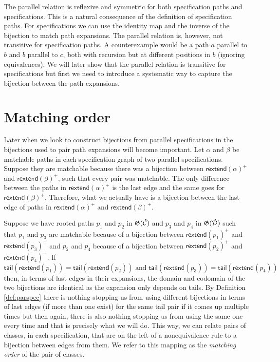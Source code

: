 The parallel relation is reflexive and symmetric for both specification paths and specifications. This is a natural consequence of the definition of specification paths. For specifications we can use the identity map and the inverse of the bijection to match path expansions. The parallel relation is, however, not transitive for specification paths. A counterexample would be a path $a$ parallel to $b$ and $b$ parallel to $c$, both with recursion but at different positions in $b$ (ignoring equivalences). We will later show that the parallel relation is transitive for specifications but first we need to introduce a systematic way to capture the bijection between the path expansions.

\section{Matching order}
Later when we look to construct bijections from parallel specifications in  the bijections used to pair path expansions will become important. Let $\alpha$ and $\beta$ be matchable paths in each specification graph of two parallel specifications. Suppose they are matchable because there was a bijection between $\textsf{rextend}(\alpha)^+$ and $\textsf{rextend}(\beta)^+$, such that every pair was matchable. The only difference between the paths in $\textsf{rextend}(\alpha)^+$ is the last edge and the same goes for $\textsf{rextend}(\beta)^+$. Therefore, what we actually have is a bijection between the last edge of paths in $\textsf{rextend}(\alpha)^+$ and $\textsf{rextend}(\beta)^+$. 

Suppose we have rooted paths $p_1$ and $p_2$ in $\mathfrak{G}(\check{\mathcal{C}})$ and $p_3$ and $p_4$ in $\mathfrak{G}(\check{\mathcal{D}})$ such that $p_1$ and $p_3$ are matchable because of a bijection between $\textsf{rextend}(p_1)^+$ and $\textsf{rextend}(p_3)^+$ and $p_2$ and $p_4$ because of a bijection between $\textsf{rextend}(p_2)^+$ and $\textsf{rextend}(p_4)^+$. If
\[
    \textsf{tail}(\textsf{rextend}(p_1)) = \textsf{tail}(\textsf{rextend}(p_2)) \text{ and } \textsf{tail}(\textsf{rextend}(p_3))=\textsf{tail}(\textsf{rextend}(p_4))
\]
then, in terms of last edges in their expansions, the domain and codomain of the two bijections are identical as the expansion only depends on tails. By Definition \ref{def:parspec} there is nothing stopping us from using different bijections in terms of last edges (if more than one exist) for the same tail pair if it comes up multiple times but then again, there is also nothing stopping us from using the same one every time and that is precisely what we will do. This way, we can relate pairs of classes, in each specification, that are on the left of a nonequivalence rule to a bijection between edges from them. We refer to this mapping as the \emph{matching order} of the pair of classes.

